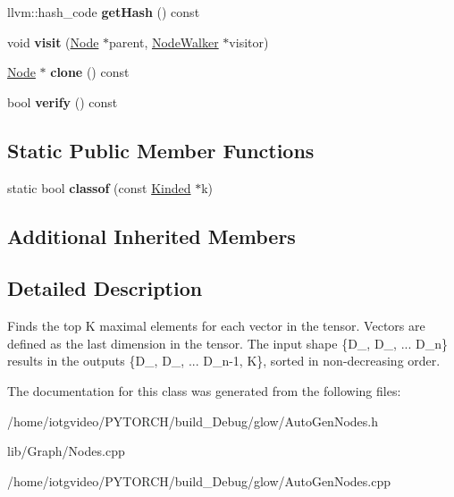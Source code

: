 \begin{DoxyCompactItemize}
llvm\+::hash\+\_\+code {\bfseries get\+Hash} () const
\item 
\mbox{\label{classglow_1_1_top_k_node_a4f86f244ab07cb9c52bb67b596d36d55}} 
void {\bfseries visit} (\hyperlink{classglow_1_1_node}{Node} $\ast$parent, \hyperlink{classglow_1_1_node_walker}{Node\+Walker} $\ast$visitor)
\item 
\mbox{\label{classglow_1_1_top_k_node_a2da67d5cf94c31505dd0531af72ef06c}} 
\hyperlink{classglow_1_1_node}{Node} $\ast$ {\bfseries clone} () const
\item 
\mbox{\label{classglow_1_1_top_k_node_aa9162a50b135fbecbbc223722d591aa2}} 
bool {\bfseries verify} () const
\end{DoxyCompactItemize}
\subsection*{Static Public Member Functions}
\begin{DoxyCompactItemize}
\item 
\mbox{\label{classglow_1_1_top_k_node_af6200930809945a5ce29fdd91002b49a}} 
static bool {\bfseries classof} (const \hyperlink{classglow_1_1_kinded}{Kinded} $\ast$k)
\end{DoxyCompactItemize}
\subsection*{Additional Inherited Members}


\subsection{Detailed Description}
Finds the top K maximal elements for each vector in the tensor. Vectors are defined as the last dimension in the tensor. The input shape \{D\+\_, D\+\_, ... D\+\_\+n\} results in the outputs \{D\+\_, D\+\_, ... D\+\_\+n-\/1, K\}, sorted in non-\/decreasing order. 

The documentation for this class was generated from the following files\+:\begin{DoxyCompactItemize}
\item 
/home/iotgvideo/\+P\+Y\+T\+O\+R\+C\+H/build\+\_\+\+Debug/glow/Auto\+Gen\+Nodes.\+h\item 
lib/\+Graph/Nodes.\+cpp\item 
/home/iotgvideo/\+P\+Y\+T\+O\+R\+C\+H/build\+\_\+\+Debug/glow/Auto\+Gen\+Nodes.\+cpp\end{DoxyCompactItemize}
